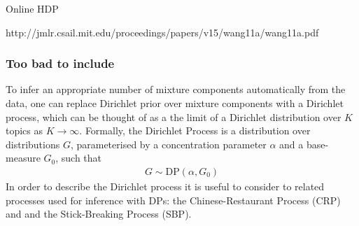 %
%

Online HDP

http://jmlr.csail.mit.edu/proceedings/papers/v15/wang11a/wang11a.pdf

\subsubsection*{Too bad to include}

To infer an appropriate number of mixture components automatically from the data, one can replace Dirichlet prior over mixture components with a Dirichlet process, which can be thought of as a the limit of a Dirichlet distribution over $K$ topics as $K \rightarrow \infty$. Formally, the Dirichlet Process is a distribution over distributions $G$, parameterised by a concentration parameter $\alpha$ and a base-measure $G_0$, such that
\begin{align*}
G \sim \text{DP}\left(\alpha, G_0\right)
\end{align*}
In order to describe the Dirichlet process it is useful to consider to related processes used for inference with DPs: the Chinese-Restaurant Process (CRP) and and the Stick-Breaking Process (SBP).


